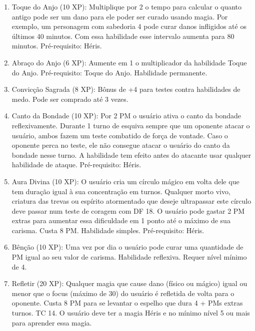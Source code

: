 \begin{enumerate}
	\item Toque do Anjo (10 XP): Multiplique por 2 o tempo para calcular o quanto antigo pode ser um dano para ele poder ser curado usando magia. Por exemplo, um personagem com sabedoria 4 pode curar danos infligidos até os últimos 40 minutos. Com essa habilidade esse intervalo aumenta para 80 minutos. Pré-requisito: Héris.
	
	\item Abraço do Anjo (6 XP): Aumente em 1 o multiplicador da habilidade Toque do Anjo. Pré-requisito: Toque do Anjo. Habilidade permanente.
	
	\item Convicção Sagrada (8 XP): Bônus de +4 para testes contra habilidades de medo. Pode ser comprado até 3 vezes.

	\item Canto da Bondade (10 XP): Por 2 PM o usuário ativa o canto da bondade reflexivamente. Durante 1 turno de esquiva sempre que um oponente atacar o usuário, ambos fazem um teste combatido de força de vontade. Caso o oponente perca no teste, ele não consegue atacar o usuário do canto da bondade nesse turno. A habilidade tem efeito antes do atacante usar qualquer habilidade de ataque. Pré-requisito: Héris.

 		\item Aura Divina (10 XP): O usuário cria um círculo mágico em volta dele que tem duração igual à sua concentração em turnos. Qualquer morto vivo, criatura das trevas ou espírito atormentado que deseje ultrapassar este círculo deve passar num teste de coragem com DF 18. O usuário pode gastar 2 PM extras para aumentar essa dificuldade em 1 ponto até o máximo de sua carisma. Custa 8 PM. Habilidade simples. Pré-requisito: Héris.

\item Bênção (10 XP): Uma vez por dia o usuário pode curar uma quantidade de PM igual ao seu valor de carisma. Habilidade reflexiva. Requer nível mínimo de 4.	


\item Refletir (20 XP): Qualquer magia que cause dano (físico ou mágico) igual ou menor que o focus (máximo de 30) do usuário é refletida de volta para o oponente. Custa 8 PM para se levantar o espelho que dura 4 + PMs extras turnos. TC 14. O usuário deve ter a magia Héris e no mínimo nível 5 ou mais para aprender essa magia. 


\end{enumerate}
